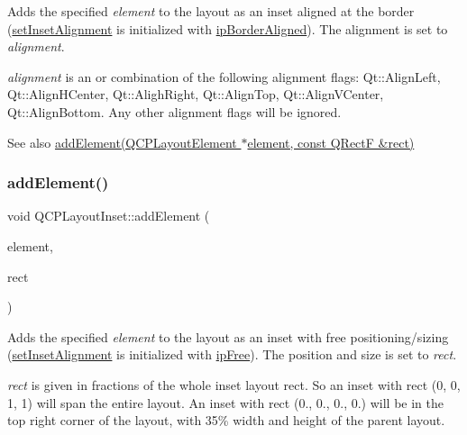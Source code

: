 Adds the specified {\itshape element} to the layout as an inset aligned at the border (\hyperlink{class_q_c_p_layout_inset_a62882a4f9ad58bb0f53da12fde022abe}{set\+Inset\+Alignment} is initialized with \hyperlink{class_q_c_p_layout_inset_a8b9e17d9a2768293d2a7d72f5e298192aa81e7df4a785ddee2229a8f47c46e817}{ip\+Border\+Aligned}). The alignment is set to {\itshape alignment}.

{\itshape alignment} is an or combination of the following alignment flags\+: Qt\+::\+Align\+Left, Qt\+::\+Align\+H\+Center, Qt\+::\+Aligh\+Right, Qt\+::\+Align\+Top, Qt\+::\+Align\+V\+Center, Qt\+::\+Align\+Bottom. Any other alignment flags will be ignored.

\begin{DoxySeeAlso}{See also}
\hyperlink{class_q_c_p_layout_inset_a8ff61fbee4a1f0ff45c398009d9f1e56}{add\+Element(\+Q\+C\+P\+Layout\+Element $\ast$element, const Q\+Rect\+F \&rect)} 
\end{DoxySeeAlso}
\mbox{\label{class_q_c_p_layout_inset_a8ff61fbee4a1f0ff45c398009d9f1e56}} 
\subsubsection{\texorpdfstring{add\+Element()}{addElement()}\hspace{0.1cm}{\footnotesize\ttfamily [2/2]}}
{\footnotesize\ttfamily void Q\+C\+P\+Layout\+Inset\+::add\+Element (\begin{DoxyParamCaption}\item[{\hyperlink{class_q_c_p_layout_element}{Q\+C\+P\+Layout\+Element} $\ast$}]{element,  }\item[{const Q\+RectF \&}]{rect }\end{DoxyParamCaption})}

Adds the specified {\itshape element} to the layout as an inset with free positioning/sizing (\hyperlink{class_q_c_p_layout_inset_a62882a4f9ad58bb0f53da12fde022abe}{set\+Inset\+Alignment} is initialized with \hyperlink{class_q_c_p_layout_inset_a8b9e17d9a2768293d2a7d72f5e298192aa4802986ea2cea457f932b115acba59e}{ip\+Free}). The position and size is set to {\itshape rect}.

{\itshape rect} is given in fractions of the whole inset layout rect. So an inset with rect (0, 0, 1, 1) will span the entire layout. An inset with rect (0., 0., 0., 0.) will be in the top right corner of the layout, with 35\% width and height of the parent layout.

